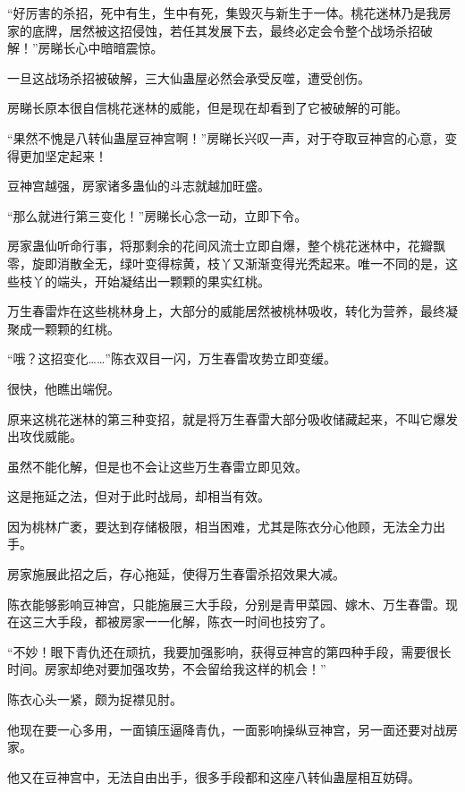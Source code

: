 
\begin{this_body}

“好厉害的杀招，死中有生，生中有死，集毁灭与新生于一体。桃花迷林乃是我房家的底牌，居然被这招侵蚀，若任其发展下去，最终必定会令整个战场杀招破解！”房睇长心中暗暗震惊。

一旦这战场杀招被破解，三大仙蛊屋必然会承受反噬，遭受创伤。

房睇长原本很自信桃花迷林的威能，但是现在却看到了它被破解的可能。

“果然不愧是八转仙蛊屋豆神宫啊！”房睇长兴叹一声，对于夺取豆神宫的心意，变得更加坚定起来！

豆神宫越强，房家诸多蛊仙的斗志就越加旺盛。

“那么就进行第三变化！”房睇长心念一动，立即下令。

房家蛊仙听命行事，将那剩余的花间风流士立即自爆，整个桃花迷林中，花瓣飘零，旋即消散全无，绿叶变得棕黄，枝丫又渐渐变得光秃起来。唯一不同的是，这些枝丫的端头，开始凝结出一颗颗的果实红桃。

万生春雷炸在这些桃林身上，大部分的威能居然被桃林吸收，转化为营养，最终凝聚成一颗颗的红桃。

“哦？这招变化……”陈衣双目一闪，万生春雷攻势立即变缓。

很快，他瞧出端倪。

原来这桃花迷林的第三种变招，就是将万生春雷大部分吸收储藏起来，不叫它爆发出攻伐威能。

虽然不能化解，但是也不会让这些万生春雷立即见效。

这是拖延之法，但对于此时战局，却相当有效。

因为桃林广袤，要达到存储极限，相当困难，尤其是陈衣分心他顾，无法全力出手。

房家施展此招之后，存心拖延，使得万生春雷杀招效果大减。

陈衣能够影响豆神宫，只能施展三大手段，分别是青甲菜园、嫁木、万生春雷。现在这三大手段，都被房家一一化解，陈衣一时间也技穷了。

“不妙！眼下青仇还在顽抗，我要加强影响，获得豆神宫的第四种手段，需要很长时间。房家却绝对要加强攻势，不会留给我这样的机会！”

陈衣心头一紧，颇为捉襟见肘。

他现在要一心多用，一面镇压逼降青仇，一面影响操纵豆神宫，另一面还要对战房家。

他又在豆神宫中，无法自由出手，很多手段都和这座八转仙蛊屋相互妨碍。


\end{this_body}
